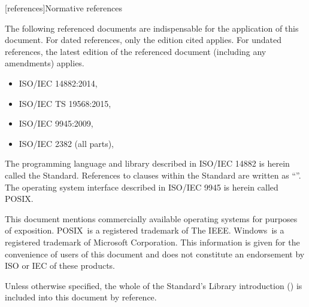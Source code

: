 
[references]{Normative references}

\pnum
The following referenced documents are indispensable for the application of this document. For dated references, only the edition cited applies. For undated references, the latest edition of the referenced document (including any amendments) applies.

\begin{itemize}
\item ISO/IEC 14882:2014, 
\item ISO/IEC TS 19568:2015, 
\item ISO/IEC 9945:2009, 
\item ISO/IEC 2382 (all parts), 
\end{itemize}

\pnum
The programming language and library described in ISO/IEC 14882 is herein called the \Cpp Standard.
References to clauses within the \Cpp Standard are written as ``''.
The operating system interface described in ISO/IEC 9945 is herein called POSIX.

\pnum
This document mentions commercially available operating systems for purposes of exposition.  POSIX\textregistered\ is a registered trademark of The IEEE. Windows\textregistered\ is a registered trademark of Microsoft Corporation. This information is given for the convenience of users of this document and does not constitute an endorsement by ISO or IEC of these products.

\pnum
Unless otherwise specified, the whole of the \Cpp Standard's Library introduction () is included into this document by reference.



